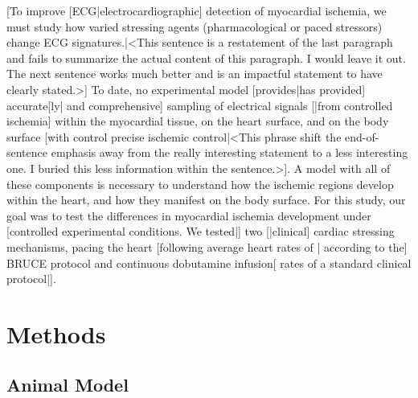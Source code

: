 \documentclass[twocolumn]{cinc}
\begin{document}
[To improve [ECG|electrocardiographic] detection of myocardial ischemia, we
must study how varied stressing agents (pharmacological or paced stressors)
change ECG signatures.|<This sentence is a restatement of the last
paragraph and fails to summarize the actual content of this paragraph.  I
would leave it out. The next sentence works much better and is an impactful
statement to have clearly stated.>] To date, no experimental model
[provides|has provided] accurate[ly| and comprehensive] sampling of
electrical signals [|from controlled ischemia] within the myocardial
tissue, on the heart surface, and on the body surface [with control precise
ischemic control|<This phrase shift the end-of-sentence emphasis away from
the really interesting statement to a less interesting one. I buried this
less information within the sentence.>]. A model with all of these
components is necessary to understand how the ischemic regions develop
within the heart, and how they manifest on the body surface. For this
study, our goal was to test the differences in myocardial ischemia
development under [controlled experimental conditions. We tested|] two
[|clinical] cardiac stressing mechanisms, pacing the heart [following
average heart rates of | according to the] BRUCE protocol and continuous
dobutamine infusion[ rates of a standard clinical protocol|].


%


\section{Methods}

\subsection{Animal Model} 
\end{document}
